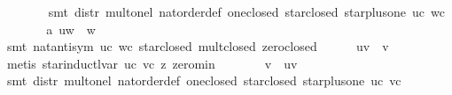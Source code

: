 \begin{isabellebody}
\ \ \ \ \ \ \isamarkupfalse%
\ {}smt\ distr\ mult{}onel\ nat{}order{}def\ one{}closed\ star{}closed\ star{}plus{}one\ uc\ wc{}\isanewline
\ \ \ \ \isamarkupfalse%
\ \isamarkupfalse%
\ a{}\ {}uw\ {}\ w{}\isanewline
\ \ \ \ \ \ \isamarkupfalse%
\ {}smt\ nat{}antisym\ uc\ wc\ star{}closed\ mult{}closed\ zero{}closed{}\isanewline
\isanewline
\ \ \ \ \isamarkupfalse%
\ {}uv\ {}\ v{}\isanewline
\ \ \ \ \ \ \isamarkupfalse%
\ {}metis\ star{}inductl{}var\ uc\ vc\ z{}\ zero{}min{}\isanewline
\ \ \ \ \isamarkupfalse%
\ \isamarkupfalse%
\ {}v\ {}\ uv{}\isanewline
\ \ \ \ \ \ \isamarkupfalse%
\ {}smt\ distr\ mult{}onel\ nat{}order{}def\ one{}closed\ star{}closed\ star{}plus{}one\ uc\ vc{}\isanewline

\end{isabellebody}
